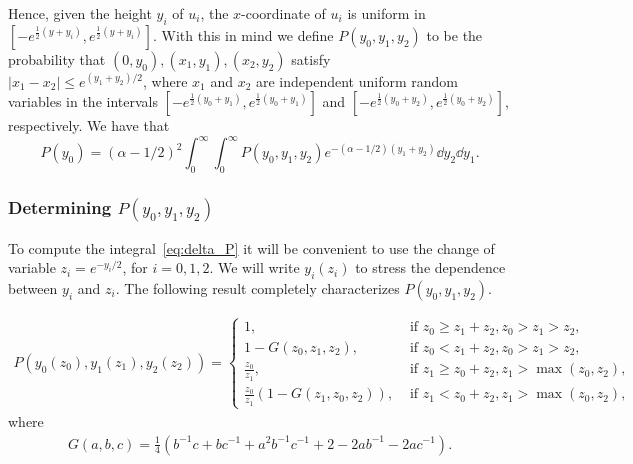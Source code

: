 Hence, given the height $y_i$ of $u_i$, the $x$-coordinate of $u_i$ is uniform in $[-e^{\frac{1}{2}(y+y_i)},e^{\frac{1}{2}(y+y_i)}]$. 
With this in mind we define $P(y_0,y_1,y_2)$ to be the probability that $(0,y_0), (x_1,y_1), (x_2,y_2)$ 
satisfy \\ $|x_1-x_2| \leq e^{(y_1+y_2)/2}$, where $x_1$ and $x_2$ are independent uniform random variables in the intervals
$[-e^{\frac{1}{2}(y_0+y_1)},e^{\frac{1}{2}(y_0+y_1)}]$ and  $[-e^{\frac{1}{2}(y_0+y_2)},e^{\frac{1}{2}(y_0+y_2)}]$, respectively. We have that
\begin{equation}\label{eq:delta_P}
 P(y_0) = (\alpha-1/2)^2 \int_0^\infty \int_0^\infty P(y_0, y_1, y_2) e^{-(\alpha-1/2)(y_1+y_2)} 
 \dd y_2 \dd y_1.
\end{equation}

\subsubsection{Determining $P(y_0,y_1,y_2)$}


To compute the integral~\eqref{eq:delta_P} it will be convenient to use the 
change of variable $z_i = e^{-y_i/2}$, for $i= 0, 1, 2$. 
We will write $y_i(z_i)$ to stress the dependence between $y_i$ and $z_i$. 
The following result completely characterizes $P(y_0,y_1,y_2)$.

\begin{lemma}\label{lem:triangle_prob_y_coordinates}
\begin{align*}
P(y_0(z_0),y_1(z_1),y_2(z_2)) = \begin{cases}
	1, &\text{ if } z_0 \geq z_1+z_2, z_0 > z_1 > z_2, \\
	1-G(z_0,z_1,z_2), &\text{ if } z_0 < z_1+z_2, z_0 > z_1 > z_2, \\
	\frac{z_0}{z_1}, &\text{ if } z_1 \geq z_0+z_2, z_1 > \max(z_0,z_2), \\
	\frac{z_0}{z_1}\left(1-G(z_1,z_0,z_2)\right), &\text{ if } z_1 < z_0+z_2, z_1 > \max(z_0,z_2),
\end{cases}
\end{align*}
where 
\begin{align*}
G(a,b,c) = \frac{1}{4}
\left( b^{-1}c + bc^{-1} + a^2b^{-1}c^{-1} + 2 - 2ab^{-1}-2ac^{-1}\right).
\end{align*}
\end{lemma}



